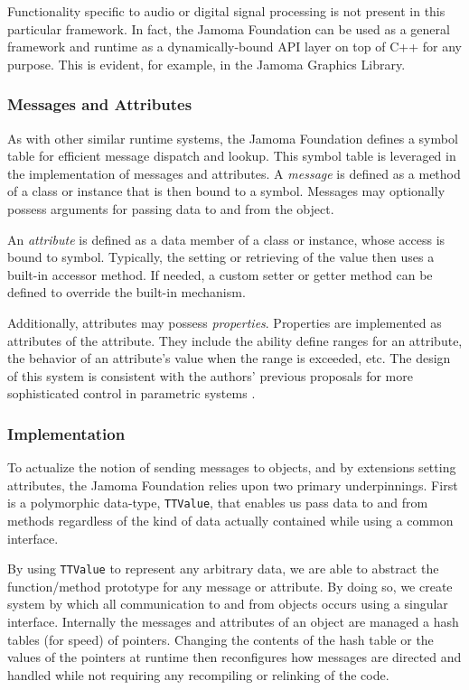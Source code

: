 \documentclass[twoside,10pt]{article}
\begin{document}
Functionality specific to audio or digital signal processing is not present in this particular framework.  In fact, the Jamoma Foundation can be used as a general framework and runtime as a dynamically-bound API layer on top of C++ for any purpose.  This is evident, for example, in the Jamoma Graphics Library.

\subsubsection{Messages and Attributes} %

As with other similar runtime systems, the Jamoma Foundation defines a symbol table for efficient message dispatch and lookup.  This symbol table is leveraged in the implementation of messages and attributes.  
A \emph{message} is defined as a method of a class or instance that is then bound to a symbol.  Messages may optionally possess arguments for passing data to and from the object.

An \emph{attribute} is defined as a data member of a class or instance, whose access is bound to symbol.  Typically, the setting or retrieving of the value then uses a built-in accessor method.  If needed, a custom setter or getter method can be defined to override the built-in mechanism.

Additionally, attributes may possess \emph{properties}.  Properties are implemented as attributes of the attribute.  They include the ability define ranges for an attribute, the behavior of an attribute's value when the range is exceeded, etc.  The design of this system is consistent with the authors' previous proposals for more sophisticated control in parametric systems \cite{Place:2008params}.

\subsubsection{Implementation}

To actualize the notion of sending messages to objects, and by extensions setting attributes, the Jamoma Foundation relies upon two primary underpinnings.  First is a polymorphic data-type, \texttt{\small{TTValue}}, that enables us pass data to and from methods regardless of the kind of data actually contained while using a common interface.  %

By using \texttt{\small{TTValue}} to represent any arbitrary data, we are able to abstract the function/method prototype for any message or attribute.  By doing so, we create system by which all communication to and from objects occurs using a singular interface.  Internally the messages and attributes of an object are managed a hash tables (for speed) of pointers.  Changing the contents of the hash table or the values of the pointers at runtime then reconfigures how messages are directed and handled while not requiring any recompiling or relinking of the code.
\end{document}
